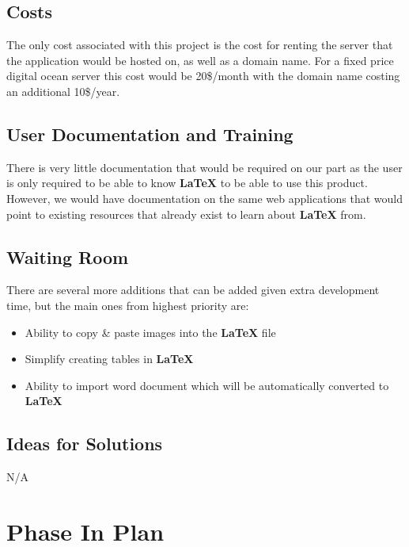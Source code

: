 \documentclass[12pt, titlepage]{article}
\begin{document}
	\subsection{Costs}
	
	The only cost associated with this project is the cost for renting the server that the application would be hosted on, as well as a domain name. For a fixed price digital ocean server this cost would be 20\$/month with the domain name costing an additional 10\$/year.
	
	\subsection{User Documentation and Training}
	
	There is very little documentation that would be required on our part as the user is only required to be able to know \textbf{LaTeX} to be able to use this product. However, we would have documentation on the same web applications that would point to existing resources that already exist to learn about \textbf{LaTeX} from.
	
	\subsection{Waiting Room}
	There are several more additions that can be added given extra development time, but the main ones from highest priority are:
	\begin{itemize}
		\item Ability to copy \& paste images into the \textbf{LaTeX} file
		\item Simplify creating tables in \textbf{LaTeX} 
		\item Ability to import word document which will be automatically converted to \textbf{LaTeX}
	\end{itemize}
	
	\subsection{Ideas for Solutions}
	N/A
	
	
	
	
	
	\section{Phase In Plan}
	
\end{document}
